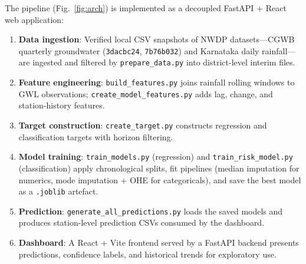 \documentclass[conference]{IEEEtran}
\begin{document}
The pipeline (Fig.~\ref{fig:arch}) is implemented as a decoupled
FastAPI + React web application:

\begin{enumerate}\setlength{\itemsep}{1pt}\setlength{\parskip}{0pt}
  \item \textbf{Data ingestion}: Verified local CSV snapshots of NWDP
        datasets---CGWB quarterly groundwater (\texttt{3dacbc24},
        \texttt{7b76b032}) and Karnataka daily rainfall---are
        ingested and filtered by \texttt{prepare\_data.py}
        into district-level interim files.
  \item \textbf{Feature engineering}: \texttt{build\_features.py}
        joins rainfall rolling windows to GWL observations;
        \texttt{create\_model\_features.py} adds lag, change, and
        station-history features.
  \item \textbf{Target construction}: \texttt{create\_target.py}
        constructs regression and classification targets with
        horizon filtering.
  \item \textbf{Model training}: \texttt{train\_models.py} (regression)
        and \texttt{train\_risk\_model.py} (classification) apply
        chronological splits, fit pipelines (median imputation for
        numerics, mode imputation + OHE for categoricals), and save
        the best model as a \texttt{.joblib} artefact.
  \item \textbf{Prediction}: \texttt{generate\_all\_predictions.py}
        loads the saved models and produces station-level prediction
        CSVs consumed by the dashboard.
  \item \textbf{Dashboard}: A React + Vite frontend served by a
        FastAPI backend presents predictions, confidence labels,
        and historical trends for exploratory use.
\end{enumerate}
\end{document}

